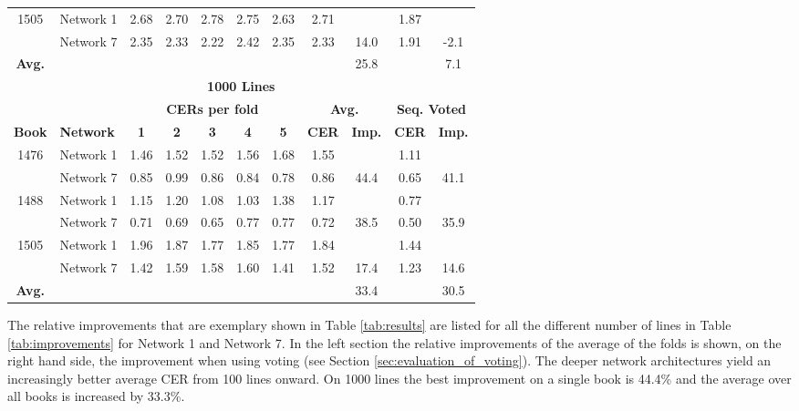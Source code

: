 \documentclass{jlcl}
\begin{document}
\begin{table}[tp]
\begin{tabular}{c|l|ccccc|cc|cc}
        1505 & Network 1 & 2.68 & 2.70 & 2.78 & 2.75 & 2.63 & 2.71 &      & 1.87 &       \\
             & Network 7 & 2.35 & 2.33 & 2.22 & 2.42 & 2.35 & 2.33 & 14.0 & 1.91 &  -2.1 \\
        \hline
        \textbf{Avg.} &         &      &      &      &      &      &      & 25.8 &      &   7.1 \\
        \hline
        \hline
        \multicolumn{11}{c}{\textbf{1000 Lines}} \\
        \hline
        \hline
             &       &\multicolumn{5}{c|}{\textbf{CERs per fold}} & \multicolumn{2}{c}{\textbf{Avg.}} & \multicolumn{2}{c}{\textbf{Seq. Voted}} \\
        \hline
        \textbf{Book} & \textbf{Network} & \textbf{1} & \textbf{2} & \textbf{3} & \textbf{4} & \textbf{5} & \textbf{CER} & \textbf{Imp.} & \textbf{CER} & \textbf{Imp.} \\
        \hline
        1476 & Network 1 & 1.46 & 1.52 & 1.52 & 1.56 & 1.68 & 1.55 &      & 1.11 &       \\
             & Network 7 & 0.85 & 0.99 & 0.86 & 0.84 & 0.78 & 0.86 & 44.4 & 0.65 &  41.1 \\
        1488 & Network 1 & 1.15 & 1.20 & 1.08 & 1.03 & 1.38 & 1.17 &      & 0.77 &       \\
             & Network 7 & 0.71 & 0.69 & 0.65 & 0.77 & 0.77 & 0.72 & 38.5 & 0.50 &  35.9 \\
        1505 & Network 1 & 1.96 & 1.87 & 1.77 & 1.85 & 1.77 & 1.84 &      & 1.44 &       \\
             & Network 7 & 1.42 & 1.59 & 1.58 & 1.60 & 1.41 & 1.52 & 17.4 & 1.23 &  14.6 \\
        \hline
        \textbf{Avg.} &         &      &      &      &      &      &      & 33.4 &      &  30.5 \\
        \hline

    \end{tabular}
\end{table}

The relative improvements that are exemplary shown in Table \ref{tab:results} are listed for all the different number of lines in Table \ref{tab:improvements} for Network 1 and Network 7.
In the left section the relative improvements of the average of the folds is shown, on the right hand side, the improvement when using voting (see Section \ref{sec:evaluation_of_voting}).
The deeper network architectures yield an increasingly better average CER from 100 lines onward.
On 1000 lines the best improvement on a single book is 44.4\% and the average over all books is increased by 33.3\%.
\end{document}
